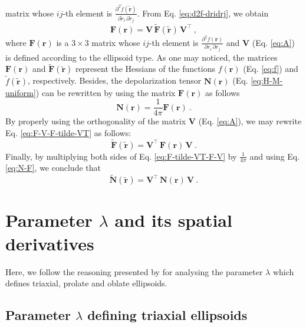\documentclass[gmd, manuscript]{copernicus}
\begin{document}
matrix whose $ij$-th element is
$\frac{\partial^{2} \tilde{f}(\tilde{\mathbf{r}})}
{\partial \tilde{r}_{i} \, \partial \tilde{r}_{j}}$.
From Eq. \ref{eq:d2f-dridrj}, we obtain
\begin{equation}
\mathbf{F}(\mathbf{r}) = \mathbf{V} \,
\tilde{\mathbf{F}}(\tilde{\mathbf{r}}) \, \mathbf{V}^{\top} \: ,
\label{eq:F-V-F-tilde-VT}
\end{equation}
where $\mathbf{F}(\mathbf{r})$ is a $3 \times 3$
matrix whose $ij$-th element is
$\frac{\partial^{2} f(\mathbf{r})}
{\partial r_{i} \, \partial r_{j}}$ and
$\mathbf{V}$ (Eq. \ref{eq:A}) is defined according
to the ellipsoid type. As one may noticed,
the matrices $\mathbf{F}(\mathbf{r})$ and
$\tilde{\mathbf{F}}(\tilde{\mathbf{r}})$ represent the Hessians
of the functions $f(\mathbf{r})$ (Eq. \ref{eq:f})
and $\tilde{f}(\tilde{\mathbf{r}})$, respectively.
Besides, the depolarization tensor $\mathbf{N}(\mathbf{r})$
(Eq. \ref{eq:H-M-uniform}) can be
rewritten by using the matrix $\mathbf{F}(\mathbf{r})$
as follows
\begin{equation}
\mathbf{N}(\mathbf{r}) = \frac{1}{4 \pi} \mathbf{F}(\mathbf{r}) \: .
\label{eq:N-F}
\end{equation}
By properly using the orthogonality of the matrix
$\mathbf{V}$ (Eq. \ref{eq:A}), we may rewrite Eq. \ref{eq:F-V-F-tilde-VT}
as follows:
\begin{equation}
\tilde{\mathbf{F}}(\tilde{\mathbf{r}}) = \mathbf{V}^{\top} \,
\mathbf{F}(\mathbf{r}) \, \mathbf{V} \: .
\label{eq:F-tilde-VT-F-V}
\end{equation}
Finally, by multiplying both sides of Eq. \ref{eq:F-tilde-VT-F-V}
by $\frac{1}{4 \pi}$ and using Eq. \ref{eq:N-F},
we conclude that
\begin{equation}
\tilde{\mathbf{N}}(\tilde{\mathbf{r}}) =
\mathbf{V}^{\top} \, \mathbf{N}(\mathbf{r}) \, \mathbf{V} \: .
\label{eq:N-tilde-VT-N-V}
\end{equation}

\section{Parameter $\lambda$ and its spatial derivatives}    %

Here, we follow the reasoning presented by \citet{webster1904}
for analysing the parameter $\lambda$ which defines triaxial, prolate
and oblate ellipsoids.

\subsection{Parameter $\lambda$ defining triaxial ellipsoids} %
\end{document}
